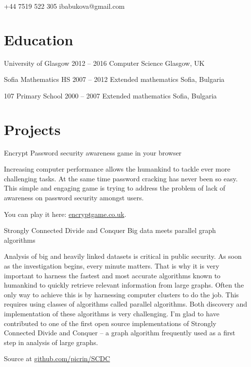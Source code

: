 \documentclass{tccv}
\begin{document}
    {+44 7519 522 305}
    {ibabukova@gmail.com}

\section{Education}

\begin{yearlist}

\item[University of Glasgow]
     {2012 -- 2016}
     {Computer Science}
     {Glasgow, UK}

\item[Sofia Mathematics HS]
     {2007 -- 2012}
     {Extended mathematics}
     {Sofia, Bulgaria}

\item[107 Primary School]
     {2000 -- 2007}
     {Extended mathematics}
     {Sofia, Bulgaria}
\end{yearlist}

\section{Projects}

\begin{eventlist}

\item{Encrypt}
     {Password security awareness game in your browser}
     {Increasing computer performance allows the humankind to tackle ever more challenging tasks. At the same time password cracking has never been so easy. This simple and engaging game is trying to address the problem of lack of awareness on password security amongst users. \par\medskip You can play it here: \href{encryptgame.co.uk}{encryptgame.co.uk}.
     }

\item{Strongly Connected Divide and Conquer}
   {Big data meets parallel graph algorithms}
   {Analysis of big and heavily linked datasets is critical in public security. As soon as the investigation begins, every minute matters. That is why it is very important to harness the fastest and most accurate algorithms known to humankind to quickly retrieve relevant information from large graphs. Often the only way to achieve this is by harnessing computer clusters to do the job. This requires using classes of algorithms called parallel algorithms. Both discovery and implementation of these algorithms is very challenging. I'm glad to have contributed to one of the first open source implementations of Strongly Connected Divide and Conquer -- a graph algorithm frequently used as a first step in analysis of large graphs. \par\medskip
   Source at
   \href{http://github.com/picrin/SCDC}{github.com/picrin/SCDC}
   }

\end{eventlist}
\end{document}
